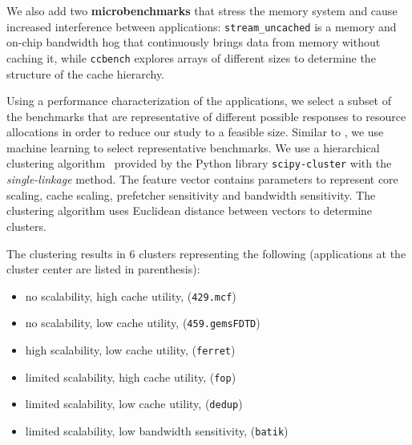 We also add two \textbf{microbenchmarks} that stress the memory
system and cause increased interference between applications: {\tt stream\_uncached} is a memory and on-chip bandwidth hog
that continuously brings data from memory without caching it, while
{\tt ccbench} explores arrays of different sizes to determine the
structure of the cache hierarchy.

Using a performance characterization of the applications, we select a subset of the benchmarks that are representative of different possible responses to resource allocations in order to reduce our study to a feasible size.  Similar to \cite{Phansalkar:ISCA2007}, we use machine learning to select representative benchmarks.  We use a
hierarchical clustering algorithm~\cite{Phansalkar:ISCA2007} provided by the Python library \texttt{scipy-cluster} with the \textit{single-linkage} method.  The feature vector contains parameters to represent core scaling, cache scaling, prefetcher sensitivity and bandwidth sensitivity.  The clustering algorithm uses Euclidean distance between vectors to determine clusters.

The clustering results in 6 clusters representing the following (applications at the cluster center are listed in parenthesis):
 \begin{itemize}\itemsep0pt \parskip0pt 
\item no scalability, high cache utility, ({\tt 429.mcf})
\item no scalability, low cache utility, ({\tt 459.gems\-FDTD})
\item high scalability, low cache utility, ({\tt ferret})
\item limited scalability, high cache utility, ({\tt fop})
\item limited scalability, low cache utility, ({\tt dedup})
\item limited scalability, low bandwidth sensitivity, ({\tt batik})
\end{itemize}



